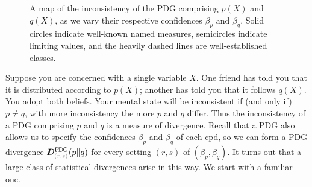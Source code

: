 \documentclass[twoside]{article}
\makeatletter
\theoremstyle{plain}
\theoremstyle{definition}
\newcommand{\thickD}{I\mkern-8muD}
\newcommand\aar{\@ifstar\aar@one@star\aar@plain}
\newcommand\aar@one@star{\@ifstar\aar@resize{\aar@plain*}}
\newcommand\aar@resize[1]{\sbox{\aar@content}{#1}\scaleleftright[3.8ex]
			{\Biggl\langle\!\!\!\!\Biggl\langle}{\usebox{\aar@content}}
			{\Biggr\rangle\!\!\!\!\Biggr\rangle}}
\makeatother
\begin{document}
\begin{figure*}
\begin{tikzpicture}[xscale=1.8, yscale=1.4]
	\end{tikzpicture}
	\caption{A map of the inconsistency of the PDG comprising $p(X)$ and $q(X)$, as we vary their respective confidences $\beta_p$ and $\beta_q$. Solid circles indicate well-known named measures, semicircles indicate limiting values, and the heavily dashed lines are well-established classes. }
	\label{fig:statdistmap}
\end{figure*}

Suppose you are concerned with a single variable $X$. One friend has told you that it is distributed according to $p(X)$; another has told you that it follows $q(X)$. You adopt both beliefs. Your mental state will be inconsistent if (and only if) $p \ne q$, with more inconsistency the more $p$ and $q$ differ.
Thus the inconsistency of a PDG comprising $p$ and $q$ is a measure of divergence.
%
%
Recall that a PDG also allows us to specify the confidences $\beta_p$
and $\beta_q$ of each cpd, so we can form a PDG divergence
$\thickD^{\mathrm{P\mskip-2muD\mskip-1.5muG}}_{{\color{gray}(r,s)}}(p\Vert q)$
for every setting $(r,s)$ of $(\beta_p, \beta_q)$.
It turns out that a large class of statistical divergences arise in this way.
We start with a familiar one.
\end{document}
